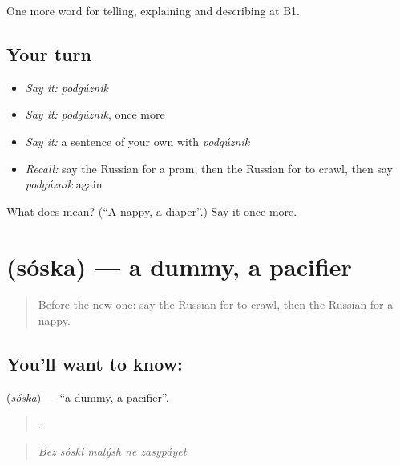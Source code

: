 \begin{grammarlens}[title={What you've built}]
One more word for telling, explaining and describing at B1.
\end{grammarlens}

\subsection*{Your turn}
\begin{itemize}
\raggedright
  \item \emph{Say it:} \emph{podgúznik}
  \item \emph{Say it:} \emph{podgúznik}, once more
  \item \emph{Say it:} a sentence of your own with \emph{podgúznik}
  \item \emph{Recall:} say the Russian for a pram, then the Russian for to crawl, then say \emph{podgúznik} again
\end{itemize}

\begin{tcolorbox}[breakable,colback=teal!4,colframe=teal!35!black,title={Before you move on}]
What does  mean? (\textquotedblleft{}A nappy, a diaper\textquotedblright{}.) Say it once more.
\end{tcolorbox}
\section[\texorpdfstring{\ru{соска} (sóska)}{соска (sóska)}]{ (sóska) — a dummy, a pacifier}

\label{lesson:RU-C496-soska}



\begin{quote}
Before the new one: say the Russian for to crawl, then the Russian for a nappy.
\end{quote}

\subsection*{You'll want to know: }
\textbf{} (\emph{sóska}) — \textquotedblleft{}a dummy, a pacifier\textquotedblright{}.

\begin{quote}
    .
\end{quote}

\begin{quote}
\emph{Bez sóski malýsh ne zasypáyet.}
\end{quote}

